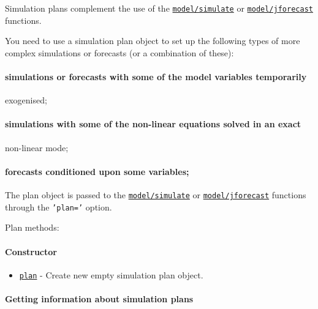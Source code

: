 

	Simulation plans complement the use of the
\href{model/simulate}{\texttt{model/simulate}} or
\href{model/jforecast}{\texttt{model/jforecast}} functions.

You need to use a simulation plan object to set up the following types
of more complex simulations or forecasts (or a combination of these):

\paragraph{simulations or forecasts with some of the model variables
temporarily}\label{simulations-or-forecasts-with-some-of-the-model-variables-temporarily}

exogenised;

\paragraph{simulations with some of the non-linear equations solved in
an
exact}\label{simulations-with-some-of-the-non-linear-equations-solved-in-an-exact}

non-linear mode;

\paragraph{forecasts conditioned upon some
variables;}\label{forecasts-conditioned-upon-some-variables}

The plan object is passed to the
\href{model/simulate}{\texttt{model/simulate}} or
\href{model/jforecast}{\texttt{model/jforecast}} functions through the
\texttt{'plan='} option.

Plan methods:

\paragraph{Constructor}\label{constructor}

\begin{itemize}
\itemsep1pt\parskip0pt
\item
  \href{plan/plan}{\texttt{plan}} - Create new empty simulation plan
  object.
\end{itemize}

\paragraph{Getting information about simulation
plans}\label{getting-information-about-simulation-plans}

